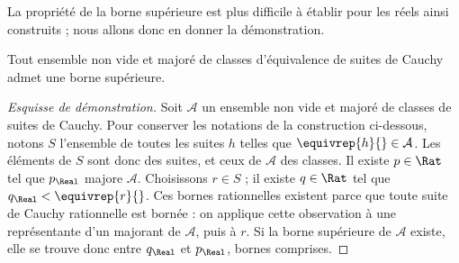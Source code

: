 \documentclass[../../../include/open-logic-section]{subfiles}
\begin{document}
La propriété de la borne supérieure est plus difficile à établir pour
les réels ainsi construits ; nous allons donc en donner la démonstration.

\begin{thm}
Tout ensemble non vide et majoré de classes d'équivalence de suites
de Cauchy admet une borne supérieure.
\end{thm}

\begin{proof}[Esquisse de démonstration]
Soit $\mathcal A$ un ensemble non vide et majoré de classes de suites
de Cauchy. Pour conserver les notations de la construction ci-dessous,
notons $S$ l'ensemble de toutes les suites $h$ telles que
$\equivrep{h}{}\in\mathcal A$. Les éléments de $S$ sont donc des suites,
et ceux de $\mathcal A$ des classes. Il existe $p\in\Rat$ tel que
$p_\Real$ majore $\mathcal A$. Choisissons $r\in S$ ; il existe
$q\in\Rat$ tel que $q_\Real<\equivrep{r}{}$. Ces bornes rationnelles
existent parce que toute suite de Cauchy rationnelle est bornée :
on applique cette observation à une représentante d'un majorant
de $\mathcal A$, puis à $r$. Si la borne supérieure de $\mathcal A$
existe, elle se trouve donc entre $q_\Real$ et $p_\Real$, bornes comprises.


\end{proof}
\end{document}
